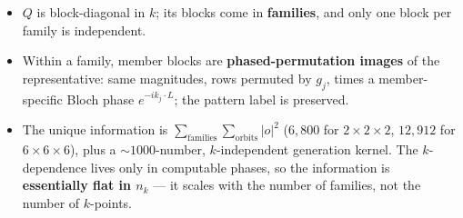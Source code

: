 \documentclass[11pt]{article}
\begin{document}
\begin{itemize}[nosep]
  \item $Q$ is block-diagonal in $k$; its blocks come in \textbf{families}, and only one block per
        family is independent.
  \item Within a family, member blocks are \textbf{phased-permutation images} of the representative:
        same magnitudes, rows permuted by $g_j$, times a member-specific Bloch phase
        $e^{-ik_j\cdot L}$; the pattern label is preserved.
  \item The unique information is $\sum_{\text{families}}\sum_{\text{orbits}}|o|^2$
        ($6{,}800$ for $2\times2\times2$, $12{,}912$ for $6\times6\times6$), plus a
        $\sim\!1000$-number, $k$-independent generation kernel. The $k$-dependence lives only in
        computable phases, so the information is \textbf{essentially flat in $n_k$} --- it scales with
        the number of families, not the number of $k$-points.
\end{itemize}
\end{document}
